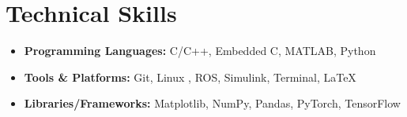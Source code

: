 \documentclass[letterpaper,11pt]{article}
\newcommand{\resumeItem}[1]{
  \item\small{
    {#1 \vspace{-2pt}}
  }
}
\newcommand{\resumeSubHeadingListEnd}{\end{itemize}}
\newcommand{\resumeItemListEnd}{\end{itemize}\vspace{-5pt}}
\begin{document}
  
 \vspace{-6pt}


%
\section{Technical Skills} %



\begingroup
  \footnotesize        %
  \begin{itemize}[leftmargin=0.15in,label={}, itemsep=-2pt, parsep=3pt] 
    \item \textbf{Programming Languages:} C/C++, Embedded C, MATLAB, Python
    \item \textbf{Tools \& Platforms:} Git, Linux \faLinux, ROS, Simulink, \faTerminal Terminal, \LaTeX
    \item \textbf{Libraries/Frameworks:} Matplotlib, NumPy, Pandas, PyTorch, TensorFlow
  \end{itemize}
\endgroup





 
\end{document}
